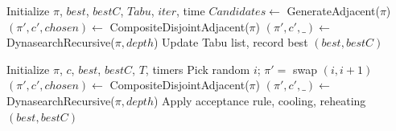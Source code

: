 \documentclass[runningheads]{llncs}
\newcommand{\perm}{\pi}
\begin{document}
{\begin{algorithm}[H]
  \caption{TabuSearch$(processing\;times, T_{limit}, \tau_{tabu}, neigMode)$}
  \begin{algorithmic}[1]
    \State Initialize $\perm$, $best$, $bestC$, $Tabu$, $iter$, time
        \State $Candidates \gets$ GenerateAdjacent($\perm$)
        \State $(\perm', c', chosen) \gets$ CompositeDisjointAdjacent($\perm$)
        \State $(\perm', c', \_) \gets$ DynasearchRecursive($\perm, depth$)
      \EndIf
      \State Update Tabu list, record best
    \EndWhile
    \State \Return $(best, bestC)$
  \end{algorithmic}
\end{algorithm}

\begin{algorithm}[H]
  \caption{SimulatedAnnealing$(P, T_{limit}, T_{init}, T_{final}, \alpha, r, \tau_{stagn}, neigMode)$}
  \begin{algorithmic}[1]
    \State Initialize $\perm$, $c$, $best$, $bestC$, $T$, timers
        \State Pick random $i$; $\perm' =$ swap $(i,i{+}1)$
        \State $(\perm', c', chosen) \gets$ CompositeDisjointAdjacent($\perm$)
        \State $(\perm', c', \_) \gets$ DynasearchRecursive($\perm, depth$)
      \EndIf
      \State Apply acceptance rule, cooling, reheating
    \EndWhile
    \State \Return $(best, bestC)$
  \end{algorithmic}
\end{algorithm}
}




\end{document}
